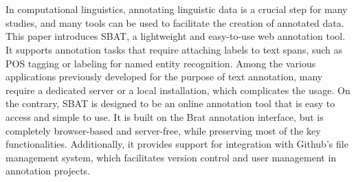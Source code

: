 \documentclass[12ptm a4paper]{article}
\begin{document}
% 
\newpage
\section*{}
In computational linguistics, annotating linguistic data is a crucial step for many studies, and many tools can be used to facilitate the creation of annotated data. This paper introduces SBAT, a lightweight and easy-to-use web annotation tool. It supports annotation tasks that require attaching labels to text spans, such as POS tagging or labeling for named entity recognition. Among the various applications previously developed for the purpose of text annotation, many require a dedicated server or a local installation, which complicates the usage. On the contrary, SBAT is designed to be an online annotation tool that is easy to access and simple to use. It is built on the Brat annotation interface, but is completely browser-based and server-free, while preserving most of the key functionalities. Additionally, it provides support for integration with Github's file management system, which facilitates version control and user management in annotation projects.
\newpage
\tableofcontents
\newpage
\listoffigures
\newpage
{}
\end{document}
